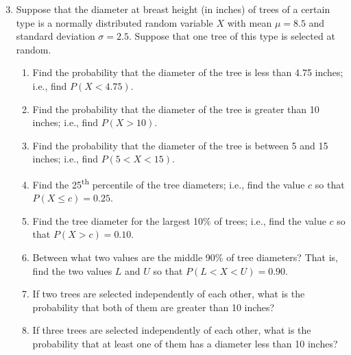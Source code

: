 \documentclass{report}
\begin{document}
 \pagebreak \bigbreak \noindent 
 \begin{mdframed}
     \begin{enumerate}[label=\arabic*.]
         \setcounter{enumi}{2}
         \item Suppose that the diameter at breast height (in inches) of trees of a certain type is a normally distributed random variable \( X \) with mean \( \mu = 8.5 \) and standard deviation \( \sigma = 2.5 \). Suppose that one tree of this type is selected at random.
             \begin{enumerate}[label=(\alph*)]
                 \item Find the probability that the diameter of the tree is less than 4.75 inches; i.e., find \( P(X < 4.75) \).
                 \item Find the probability that the diameter of the tree is greater than 10 inches; i.e., find \( P(X > 10) \).
                 \item Find the probability that the diameter of the tree is between 5 and 15 inches; i.e., find \( P(5 < X < 15) \).
                 \item Find the 25\textsuperscript{th} percentile of the tree diameters; i.e., find the value \( c \) so that \( P(X \leq c) = 0.25 \).
                 \item Find the tree diameter for the largest 10\% of trees; i.e., find the value \( c \) so that \( P(X > c) = 0.10 \).
                 \item Between what two values are the middle 90\% of tree diameters? That is, find the two values \( L \) and \( U \) so that \( P(L < X < U) = 0.90 \).
                 \item If two trees are selected independently of each other, what is the probability that both of them are greater than 10 inches?
                 \item If three trees are selected independently of each other, what is the probability that at least one of them has a diameter less than 10 inches?
             \end{enumerate}
     \end{enumerate}
 \end{mdframed}
 \bigbreak \noindent 
\end{document}
